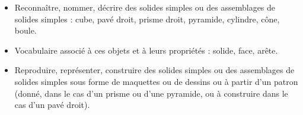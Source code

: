 \begin{prerequis}    
    \begin{itemize}
        \item[\emoji{red-heart}] Reconnaître, nommer, décrire des solides simples ou des assemblages de solides simples : cube, pavé droit, prisme droit, pyramide, cylindre, cône, boule.
        \item[\emoji{red-heart}] Vocabulaire associé à ces objets et à leurs propriétés : solide, face, arête.
        \columnbreak
        \item[\emoji{diamond-suit}] Reproduire, représenter, construire des solides simples ou des assemblages de solides simples sous forme de maquettes ou de dessins ou à partir d’un patron (donné, dans le cas d’un prisme ou d’une pyramide, ou à construire dans le cas d’un pavé droit).
    \end{itemize}
\end{prerequis}